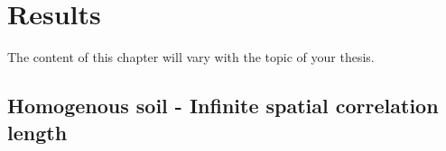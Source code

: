 \chapter[Results]{Results}
The content of this chapter will vary with the topic of your thesis. 


\section{Homogenous soil - Infinite spatial correlation length}






